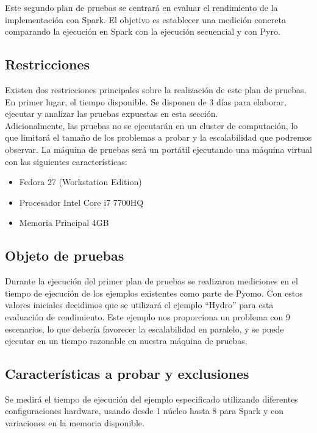 Este segundo plan de pruebas se centrará en evaluar el rendimiento de la implementación con Spark. El objetivo es establecer una medición concreta comparando la ejecución en Spark con la ejecución secuencial y con Pyro.

\subsection{Restricciones}

Existen dos restricciones principales sobre la realización de este plan de pruebas. En primer lugar, el tiempo disponible. Se disponen de 3 días para elaborar, ejecutar y analizar las pruebas expuestas en esta sección. \\

Adicionalmente, las pruebas no se ejecutarán en un cluster de computación, lo que limitará el tamaño de los problemas a probar y la escalabilidad que podremos observar. La máquina de pruebas será un portátil ejecutando una máquina virtual con las siguientes características:

\begin{itemize}
    \item Fedora 27 (Workstation Edition)
    \item Procesador Intel Core i7 7700HQ
    \item Memoria Principal 4GB
\end{itemize}

\subsection{Objeto de pruebas}

Durante la ejecución del primer plan de pruebas se realizaron mediciones en el tiempo de ejecución de los ejemplos existentes como parte de Pyomo. Con estos valores iniciales decidimos que se utilizará el ejemplo ``Hydro'' para esta evaluación de rendimiento. Este ejemplo nos proporciona un problema con 9 escenarios, lo que debería favorecer la escalabilidad en paralelo, y se puede ejecutar en un tiempo razonable en nuestra máquina de pruebas.

\subsection{Características a probar y exclusiones}

Se medirá el tiempo de ejecución del ejemplo especificado utilizando diferentes configuraciones hardware, usando desde 1 núcleo hasta 8 para Spark y con variaciones en la memoria disponible.

